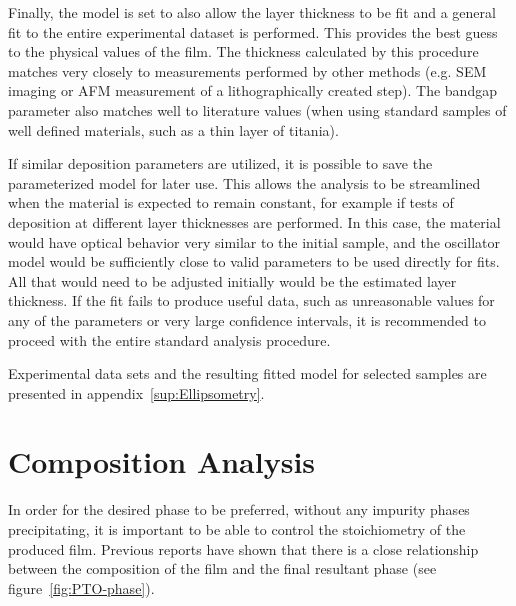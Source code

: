 Finally, the model is set to also allow the layer thickness to be fit and a general fit to the entire experimental dataset is performed. This provides the best guess to the physical values of the film. The thickness calculated by this procedure matches very closely to measurements performed by other methods (e.g. SEM imaging or AFM measurement of a lithographically created step). The bandgap parameter also matches well to literature values (when using standard samples of well defined materials, such as a thin layer of titania). 

If similar deposition parameters are utilized, it is possible to save the parameterized model for later use. This allows the analysis to be streamlined when the material is expected to remain constant, for example if tests of deposition at different layer thicknesses are performed. In this case, the material would have optical behavior very similar to the initial sample, and the oscillator model would be sufficiently close to valid parameters to be used directly for fits. All that would need to be adjusted initially would be the estimated layer thickness. If the fit fails to produce useful data, such as unreasonable values for any of the parameters or very large confidence intervals, it is recommended to proceed with the entire standard analysis procedure. 

Experimental data sets and the resulting fitted model for selected samples are presented in appendix~\ref{sup:Ellipsometry}.


\section{Composition Analysis}

In order for the desired phase to be preferred, without any impurity phases precipitating, it is important to be able to control the stoichiometry of the produced film. Previous reports have shown that there is a close relationship between the composition of the film and the final resultant phase (see figure~\ref{fig:PTO-phase}). 

